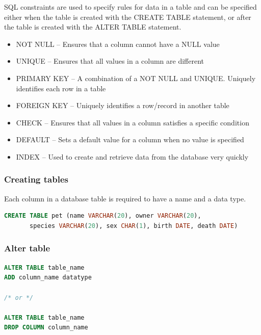 \documentclass{article}
\begin{document}
SQL constraints are used to specify rules for data in a table and can be specified either when the table is created with the CREATE TABLE statement, or after the table is created with the ALTER TABLE statement.

\begin{itemize}
    \item NOT NULL -- Ensures that a column cannot have a NULL value
    \item UNIQUE -- Ensures that all values in a column are different
    \item PRIMARY KEY -- A combination of a NOT NULL and UNIQUE. Uniquely identifies each row in a table
    \item FOREIGN KEY -- Uniquely identifies a row/record in another table
    \item CHECK -- Ensures that all values in a column satisfies a specific condition
    \item DEFAULT -- Sets a default value for a column when no value is specified
    \item INDEX -- Used to create and retrieve data from the database very quickly
\end{itemize}

\subsubsection{Creating tables}
Each column in a database table is required to have a name and a data type.

\vspace{8pt} \begin{lstlisting}[language=SQL]
CREATE TABLE pet (name VARCHAR(20), owner VARCHAR(20),
       species VARCHAR(20), sex CHAR(1), birth DATE, death DATE)
\end{lstlisting} \vspace{8pt}

\subsubsection{Alter table}

\vspace{8pt} \begin{lstlisting}[language=SQL]
ALTER TABLE table_name
ADD column_name datatype

/* or */

ALTER TABLE table_name
DROP COLUMN column_name
\end{lstlisting} \vspace{8pt}
\end{document}
